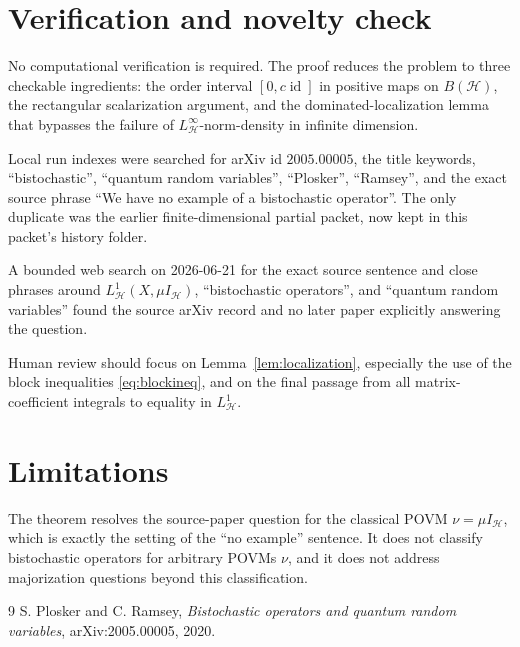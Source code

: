 \documentclass[11pt]{article}
\DeclareMathOperator{\id}{id}
\newcommand{\HH}{\mathcal H}
\begin{document}
\section*{Verification and novelty check}

No computational verification is required.  The proof reduces the problem to
three checkable ingredients: the order interval
\([0,c\id]\) in positive maps on \(B(\HH)\), the rectangular scalarization
argument, and the dominated-localization lemma that bypasses the failure of
\(L^\infty_{\HH}\)-norm-density in infinite dimension.

Local run indexes were searched for arXiv id \(2005.00005\), the title
keywords, ``bistochastic'', ``quantum random variables'', ``Plosker'',
``Ramsey'', and the exact source phrase ``We have no example of a bistochastic
operator''.  The only duplicate was the earlier finite-dimensional partial
packet, now kept in this packet's history folder.

A bounded web search on 2026-06-21 for the exact source sentence and close
phrases around \(L^1_{\HH}(X,\mu I_{\HH})\), ``bistochastic operators'', and
``quantum random variables'' found the source arXiv record \cite{PR} and no
later paper explicitly answering the question.

Human review should focus on Lemma~\ref{lem:localization}, especially the use
of the block inequalities \eqref{eq:blockineq}, and on the final passage from
all matrix-coefficient integrals to equality in \(L^1_{\HH}\).

\section*{Limitations}

The theorem resolves the source-paper question for the classical POVM
\(\nu=\mu I_{\HH}\), which is exactly the setting of the ``no example''
sentence.  It does not classify bistochastic operators for arbitrary POVMs
\(\nu\), and it does not address majorization questions beyond this
classification.

\begin{thebibliography}{9}
S. Plosker and C. Ramsey,
\emph{Bistochastic operators and quantum random variables},
arXiv:2005.00005, 2020.
\end{thebibliography}
\end{document}
